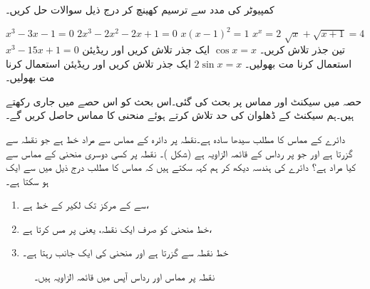 \\
کمپیوٹر کی مدد سے ترسیم کھینچ کر درج ذیل سوالات حل کریں۔

$x^3-3x-1=0$
$2x^3-2x^2-2x+1=0$
$x(x-1)^2=1$
$x^x=2$
$\sqrt{x}+\sqrt{x+1}=4$
$x^3-15x+1=0$
تین جذر تلاش کریں۔
$\cos x=x$
ایک جذر تلاش کریں اور ریڈیئن استعمال کرنا مت بھولیں۔
$2\sin x=x$
ایک جذر تلاش کریں اور ریڈیئن استعمال کرنا مت بھولیں۔



حصہ  میں سیکنٹ اور مماس پر بحث کی گئی۔اس بحث کو اس حصے میں جاری رکھتے ہیں۔ہم سیکنٹ کے  ڈھلوان کی حد تلاش کرتے ہوئے منحنی کا مماس حاصل کریں گے۔


دائرے کے  مماس  کا مطلب سیدھا سادہ ہے۔نقطہ  پر دائرہ  کے مماس سے مراد خط  ہے جو نقطہ  سے گزرتا ہے  اور جو    پر رداس کے قائمہ الزاویہ ہے (شکل )۔  نقطہ  پر کسی دوسری  منحنی  کے مماس سے کیا مراد ہے؟ دائرے کی ہندسہ دیکھ کر ہم کہہ سکتے ہیں کہ مماس کا مطلب درج ذیل میں سے ایک ہو سکتا ہے۔
\begin{enumerate}[1.]
\item
{} سے  کے مرکز تک لکیر  کے   خط  ہے،
\item
خط  منحنی  کو صرف ایک نقطہ، یعنی  پر مس کرتا ہے،
\item
 خط  نقطہ  سے گزرتا ہے اور منحنی  کی ایک جانب رہتا ہے۔ 
\end{enumerate} 
\begin{figure}
\centering
{}
\caption{
نقطہ  پر مماس اور رداس آپس میں قائمہ الزاویہ  ہیں۔
}
\label{شکل_حد_مماس_دائرہ}
\end{figure}

